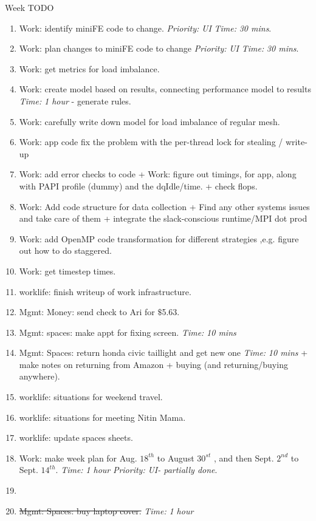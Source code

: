 \documentclass[serif, mathserif, final]{beamer}
\newcommand{\doneTask}[1]{\item \sout{#1}}
\newcommand{\timeEst}[1]{\textit{Time:} \textit{#1}}
\newcommand{\priority}[1]{\textit{Priority:} \textit{#1}}
\begin{document}
\begin{frame}{}
\begin{columns}
\begin{column}{0.50\linewidth}
\begin{block}{Week TODO}
\begin{enumerate}
\item \tiny Work: identify miniFE code to change.  \priority{UI} \timeEst{30 mins}. 
\item \tiny Work: plan changes to miniFE code to change \priority{UI} \timeEst{30 mins}. 

\item \tiny Work: get metrics for load imbalance. 
\item \tiny Work: create model based on results, connecting performance model to results \timeEst{1 hour} - generate rules. 
\item \tiny Work: carefully write down model for load imbalance of regular mesh. 

\item \tiny Work: app code fix the problem with the per-thread lock for stealing / write-up 
\item \tiny Work: add error checks to code + Work: figure out timings, for app, along with PAPI profile (dummy) and the dqIdle/time. + check flops. 
\item \tiny Work: Add code structure for data collection + Find any other systems issues and take care of them + integrate the slack-conscious runtime/MPI dot prod 
\item \tiny Work: add OpenMP code transformation for different strategies ,e.g. figure out how to do staggered. 
\item \tiny Work: get timestep times.

\item \tiny worklife: finish writeup of work infrastructure. 

\item \tiny Mgmt: Money: send check to Ari for $\$$5.63. 
\item \tiny Mgmt: spaces: make appt for fixing screen. \timeEst{10 mins}  
\item \tiny Mgmt: Spaces: return honda civic taillight and get new one \timeEst{10 mins}  + make notes on returning from Amazon + buying  (and returning/buying anywhere). 

\item \tiny worklife: situations for weekend travel. 
\item \tiny worklife: situations for meeting Nitin Mama. 

\tiny \item \tiny worklife: update spaces sheets. 
\item \tiny Work: make week plan for Aug. $18^{th}$ to August $30^{st}$ , and then Sept. $2^{nd}$ to Sept. $14^{th}$. \timeEst{1 hour} \priority{UI- partially done}. 
\item \tiny \doneTask{Mgmt: Spaces: buy laptop cover.} \timeEst{1 hour} 


\end{enumerate}
\end{block}
\end{column}
\end{columns}
\end{frame}
\end{document}

